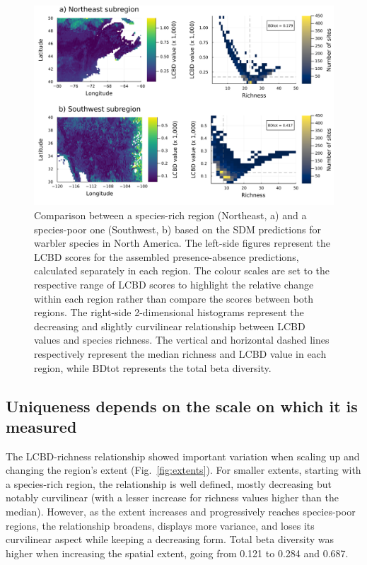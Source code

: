 \documentclass[11pt]{article}
\makeatletter
\def\maxwidth{\ifdim\Gin@nat@width>\linewidth\linewidth
\else\Gin@nat@width\fi}
\let\Oldincludegraphics\includegraphics
\renewcommand{\includegraphics}[1]{\Oldincludegraphics[width=\maxwidth]{#1}}
\makeatother
\begin{document}
\begin{figure}
\hypertarget{fig:subareas}{%
\centering
\includegraphics{figures/subareas-combined.png}
\caption{Comparison between a species-rich region (Northeast, a) and a
species-poor one (Southwest, b) based on the SDM predictions for warbler
species in North America. The left-side figures represent the LCBD
scores for the assembled presence-absence predictions, calculated
separately in each region. The colour scales are set to the respective
range of LCBD scores to highlight the relative change within each region
rather than compare the scores between both regions. The right-side
2-dimensional histograms represent the decreasing and slightly
curvilinear relationship between LCBD values and species richness. The
vertical and horizontal dashed lines respectively represent the median
richness and LCBD value in each region, while BDtot represents the total
beta diversity.}\label{fig:subareas}
}
\end{figure}

\hypertarget{uniqueness-depends-on-the-scale-on-which-it-is-measured}{%
\subsection{Uniqueness depends on the scale on which it is
measured}\label{uniqueness-depends-on-the-scale-on-which-it-is-measured}}

The LCBD-richness relationship showed important variation when scaling
up and changing the region's extent (Fig.~\ref{fig:extents}). For
smaller extents, starting with a species-rich region, the relationship
is well defined, mostly decreasing but notably curvilinear (with a
lesser increase for richness values higher than the median). However, as
the extent increases and progressively reaches species-poor regions, the
relationship broadens, displays more variance, and loses its curvilinear
aspect while keeping a decreasing form. Total beta diversity was higher
when increasing the spatial extent, going from 0.121 to 0.284 and 0.687.
\end{document}
